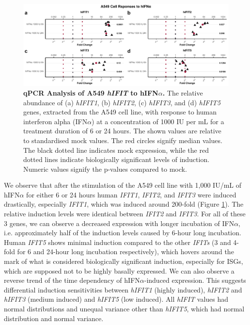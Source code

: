 \begin{figure}
    \centering
    \includegraphics[width=1\linewidth]{06. Chapter 1/Figs/01. Induction/01. a549_treat_ifna.pdf}
    \caption[qPCR Analysis of A549 \textit{hIFIT} Response to hIFN\(\alpha\).]{\textbf{qPCR Analysis of A549 \textit{hIFIT} to hIFN\(\alpha\).} The relative abundance of (a) \textit{hIFIT1}, (b) \textit{hIFIT2}, (c) \textit{hIFIT3}, and (d) \textit{hIFIT5} genes, extracted from the A549 cell line, with response to human interferon alpha (IFN\(\alpha\)) at a concentration of 1000 IU per mL for a treatment duration of 6 or 24 hours. The shown values are relative to standardised mock values. The red circles signify median values. The black dotted line indicates mock expression, while the red dotted lines indicate biologically significant levels of induction. Numeric values signify the p-values compared to mock.}
    \label{A549 Response to hIFNa}
\end{figure}

We observe that after the stimulation of the A549 cell line with 1,000 IU/mL of hIFN\(\alpha\) for either 6 or 24 hours human \textit{IFIT1}, \textit{IFIT2}, and \textit{IFIT3} were induced drastically, especially \textit{IFIT1}, which was induced around 200-fold (Figure \ref{A549 Response to hIFNa}). The relative induction levels were identical between \textit{IFIT2} and \textit{IFIT3}. For all of these 3 genes, we can observe a decreased expression with longer incubation of IFN\(\alpha\), i.e. approximately half of the induction levels caused by 6-hour long incubation. Human \textit{IFIT5} shows minimal induction compared to the other \textit{IFITs} (3 and 4-fold for 6 and 24-hour long incubation respectively), which hovers around the mark of what is considered biologically significant induction, especially for ISGs, which are supposed not to be highly basally expressed. We can also observe a reverse trend of the time dependency of hIFN\(\alpha\)-induced expression. This suggests differential induction sensitivities between \textit{hIFIT1} (highly induced), \textit{hIFIT2} and \textit{hIFIT3} (medium induced) and \textit{hIFIT5} (low induced). All \textit{hIFIT} values had normal distributions and unequal variance other than \textit{hIFIT5}, which had normal distribution and normal variance.

